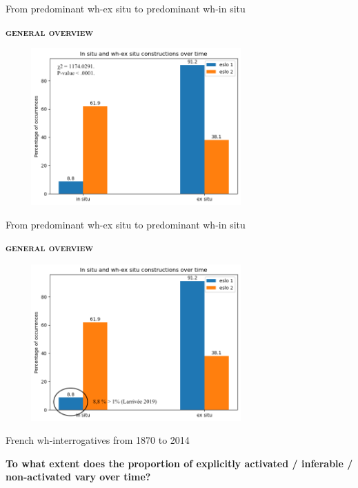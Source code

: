 \documentclass[lesson_slides]{subfiles}
\begin{document}
\begin{frame}[c]{From predominant wh-ex situ to predominant wh-in situ}

    \textbf{\textsc{general overview}}
    \begin{center}
        \includegraphics[width=10cm, height=6cm]{images/exsituinsituperc2.png}
    \end{center}
  
\end{frame}
\begin{frame}[c]{From predominant wh-ex situ to predominant wh-in situ}

    \textbf{\textsc{general overview}}
    \begin{center}
        \includegraphics[width=10cm, height=6cm]{images/exsituinsituperc4.png}
    \end{center}
  
\end{frame}
\begin{frame}[c]{French wh-interrogatives from 1870 to 2014}

    \begin{center}
        \textbf{To what extent does the proportion of explicitly activated / inferable / non-activated vary over time?}
    \end{center}
  
\end{frame}
\end{document}
